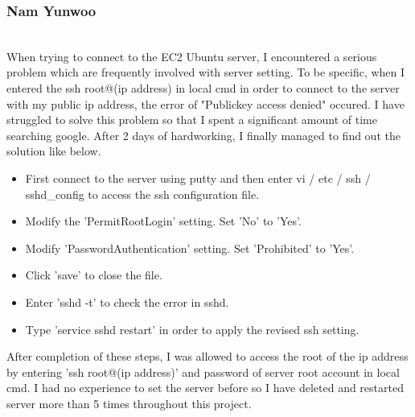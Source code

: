 \documentclass[letterpaper, 10 pt, conference]{ieeeconf}  %
\begin{document}
\subsubsection{Nam Yunwoo\\}
\\When trying to connect to the EC2 Ubuntu server, I encountered a serious problem which are frequently involved with server setting. To be specific, when I entered the ssh root@(ip address) in local cmd in order to connect to the server with my public ip address, the error of "Publickey access denied" occured. I have struggled to solve this problem so that I spent a significant amount of time searching google. After 2 days of hardworking, I finally managed to find out the solution like below.
\begin{itemize}
    \item First connect to the server using putty and then enter vi / etc / ssh / sshd\_config to access the ssh configuration file.
    \item Modify the 'PermitRootLogin' setting. Set 'No' to 'Yes'.
    \item Modify 'PasswordAuthentication' setting. Set 'Prohibited' to 'Yes'.
    \item Click 'save' to close the file.
    \item Enter 'sshd -t' to check the error in sshd.
    \item Type 'service sshd restart' in order to apply the revised ssh setting. 
\end{itemize}
After completion of these steps, I was allowed to access the root of the ip address by entering  'ssh root@(ip address)' and password of server root account in local cmd. I had no experience to set the server before so I have deleted and restarted server more than 5 times throughout this project.\\
\end{document}
